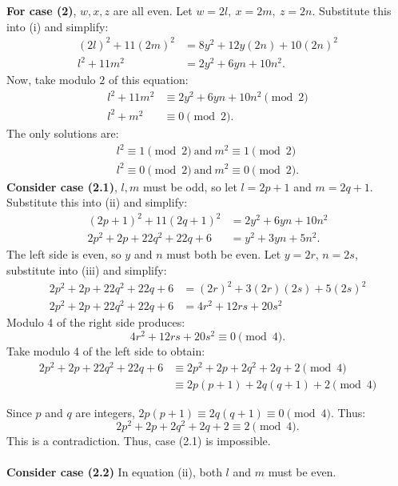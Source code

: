 \documentclass{article}
\begin{document}
\textbf{For case (2)}, $w,x,z$ are all even. Let $w = 2l,\ x = 2m,\ z = 2n$. Substitute this into (i) and simplify:
\begin{align*}
    (2l)^2 + 11(2m)^2 &= 8y^2 + 12y(2n) + 10(2n)^2 \\
    l^2 + 11m^2 &= 2y^2 + 6yn + 10n^2. \tag{ii}
\end{align*}
Now, take modulo $2$ of this equation:
\begin{align*}
    l^2 + 11m^2 &\equiv 2y^2 + 6yn + 10n^2 \pmod 2 \\
    l^2 + m^2 &\equiv 0 \pmod 2.
\end{align*}
The only solutions are:
\begin{align*}
    l^2 \equiv 1 \pmod 2 \ \text{and}\ m^2 \equiv 1 \pmod 2 \tag{2.1} \\
    l^2 \equiv 0 \pmod 2 \ \text{and}\ m^2 \equiv 0 \pmod 2. \tag{2.2}
\end{align*}
\newpage
\textbf{Consider case (2.1)}, $l,m$ must be odd, so let $l = 2p + 1$ and $m = 2q + 1$. Substitute this into (ii) and simplify:
\begin{align*}
    (2p + 1)^2 + 11(2q + 1)^2 &= 2y^2 + 6yn + 10n^2 \\
    2p^2 + 2p + 22q^2 + 22q + 6 &= y^2 + 3yn + 5n^2. \tag{iii}
\end{align*}
The left side is even, so $y$ and $n$ must both be even. Let $y = 2r$, $n = 2s$, substitute into (iii) and simplify:
\begin{align*}
    2p^2 + 2p + 22q^2 + 22q + 6 &= (2r)^2 + 3(2r)(2s) + 5(2s)^2 \\
    2p^2 + 2p + 22q^2 + 22q + 6 &= 4r^2 + 12rs + 20s^2
\end{align*}
Modulo 4 of the right side produces:
$$4r^2 + 12rs + 20s^2 \equiv 0 \pmod 4.$$
Take modulo 4 of the left side to obtain:
\begin{align*}
    2p^2 + 2p + 22q^2 + 22q + 6 &\equiv 2p^2 + 2p + 2q^2 + 2q + 2 \pmod 4 \\
    &\equiv 2p(p + 1) + 2q(q+1) + 2 \pmod 4
\end{align*}

Since $p$ and $q$ are integers, $2p(p + 1) \equiv 2q(q+1) \equiv 0 \pmod 4$. Thus:
$$2p^2 + 2p + 2q^2 + 2q + 2 \equiv 2 \pmod 4.$$
This is a contradiction. Thus, case (2.1) is impossible. \\ \\

\textbf{Consider case (2.2)} In equation (ii), both $l$ and $m$ must be even. \\
\end{document}
